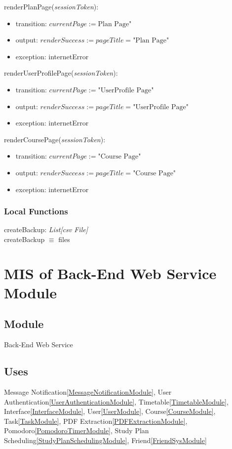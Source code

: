 \documentclass[12pt, titlepage]{article}
\begin{document}
\noindent renderPlanPage(\textit{sessionToken}):
\begin{itemize}
\item transition: \(currentPage := \text{Plan Page"}\)
\item output: \(renderSuccess := pageTitle = \text{"Plan Page"}\)
\item exception: internetError
\end{itemize}

\noindent renderUserProfilePage(\textit{sessionToken}):
\begin{itemize}
\item transition: \(currentPage := \text{"UserProfile Page"}\)
\item output: \(renderSuccess := pageTitle = \text{"UserProfile Page"}\)
\item exception: internetError
\end{itemize}

\noindent renderCoursePage(\textit{sessionToken}):
\begin{itemize}
\item transition: \(currentPage := \text{"Course Page"}\)
\item output: \(renderSuccess := pageTitle = \text{"Course Page"}\)
\item exception: internetError
\end{itemize}


\subsubsection{Local Functions}
\noindent createBackup:  \textit{List[csv File]} \\
\noindent createBackup $\equiv$ files


\newpage
\section{MIS of Back-End Web Service Module} \label{BackEndWebServiceModule}

\subsection{Module}
Back-End Web Service

\subsection{Uses}
Message Notification\ref{MessageNotificationModule}, User Authentication\ref{UserAuthenticationModule}, Timetable\ref{TimetableModule}, Interface\ref{InterfaceModule}, User\ref{UserModule}, Course\ref{CourseModule}, Task\ref{TaskModule}, PDF Extraction\ref{PDFExtractionModule}, Pomodoro\ref{PomodoroTimerModule}, Study Plan Scheduling\ref{StudyPlanSchedulingModule}, Friend\ref{FriendSysModule}
\
\end{document}
